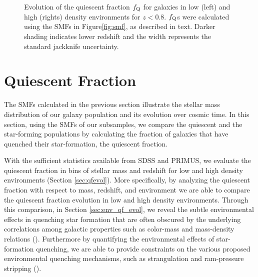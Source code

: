 \documentclass{emulateapj}
\begin{document}
\begin{figure*}
    \begin{center}
        \leavevmode
        \caption{Evolution of the quiescent fraction $f_{\rm{Q}}$ for galaxies in low (left) and high (rights) density environments for $z < 0.8$. $f_{\rm{Q}}$s were calculated using the SMFs in Figure\ref{fig:smf}, as described in text. Darker shading indicates lower redshift and the width represents the standard jackknife uncertainty.}         \label{fig:qf}
    \end{center}
\end{figure*}
\section{Quiescent Fraction} \label{sec:qf_const}
The SMFs calculated in the previous section illustrate the stellar mass distribution of our galaxy population and its evolution over cosmic time. In this section, using the SMFs of our subsamples, we compare the quiescent and the star-forming populations by calculating the fraction of galaxies that have quenched their star-formation, the quiescent fraction. 

With the sufficient statistics available from SDSS and PRIMUS, we evaluate the quiescent fraction in bins of stellar mass and redshift for low and high density environments (Section \ref{sec:qfevol}). More specifically, by analyzing the quiescent fraction with respect to mass, redshift, and environment we are able to compare the quiescent fraction evolution in low and high density environments. Through this comparison, in Section \ref{sec:env_qf_evol}, we reveal the subtle environmental effects in quenching star formation that are often obscured by the underlying correlations among galactic properties such as color-mass and mass-density relations (\citealt{Cooper:2010aa}). Furthermore by quantifying the environmental effects of star-formation quenching, we are able to provide constraints on the various proposed environmental quenching mechanisms, such as strangulation and ram-pressure stripping (\citealt{McCarthy:2008aa}).
\end{document}
